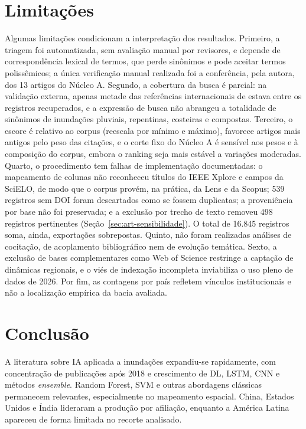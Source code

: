 \section{Limitações}
\label{sec:art-limitacoes}

Algumas limitações condicionam a interpretação dos resultados. Primeiro, a triagem foi automatizada, sem avaliação manual por revisores, e depende de correspondência lexical de termos, que perde sinônimos e pode aceitar termos polissêmicos; a única verificação manual realizada foi a conferência, pela autora, dos 13 artigos do Núcleo A. Segundo, a cobertura da busca é parcial: na validação externa, apenas metade das referências internacionais de  estava entre os registros recuperados, e a expressão de busca não abrangeu a totalidade de sinônimos de inundações pluviais, repentinas, costeiras e compostas. Terceiro, o escore é relativo ao corpus (reescala por mínimo e máximo), favorece artigos mais antigos pelo peso das citações, e o corte fixo do Núcleo A é sensível aos pesos e à composição do corpus, embora o ranking seja mais estável a variações moderadas. Quarto, o procedimento tem falhas de implementação documentadas: o mapeamento de colunas não reconheceu títulos do IEEE Xplore e campos da SciELO, de modo que o corpus provém, na prática, da Lens e da Scopus; 539 registros sem DOI foram descartados como se fossem duplicatas; a proveniência por base não foi preservada; e a exclusão por trecho de texto removeu 498 registros pertinentes (Seção~\ref{sec:art-sensibilidade}). O total de 16.845 registros soma, ainda, exportações sobrepostas. Quinto, não foram realizadas análises de cocitação, de acoplamento bibliográfico nem de evolução temática. Sexto, a exclusão de bases complementares como Web of Science restringe a captação de dinâmicas regionais, e o viés de indexação incompleta inviabiliza o uso pleno de dados de 2026. Por fim, as contagens por país refletem vínculos institucionais e não a localização empírica da bacia avaliada.

\section{Conclusão}
\label{sec:art-conclusao}

A literatura sobre IA aplicada a inundações expandiu-se rapidamente, com concentração de publicações após 2018 e crescimento de DL, LSTM, CNN e métodos \textit{ensemble}. Random Forest, SVM e outras abordagens clássicas permanecem relevantes, especialmente no mapeamento espacial. China, Estados Unidos e Índia lideraram a produção por afiliação, enquanto a América Latina apareceu de forma limitada no recorte analisado.

